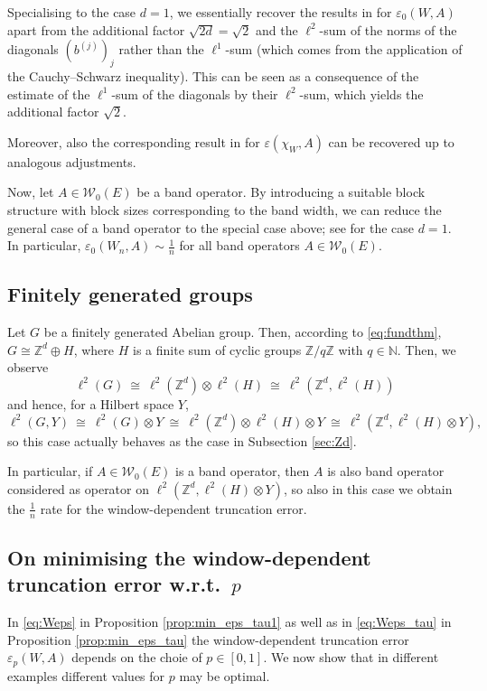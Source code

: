 \documentclass{article}
\newcommand\N{{\mathbb N}}
\newcommand\W{{\mathcal W}}
\newcommand\Z{{\mathbb Z}}
\newcommand\eps{{\varepsilon}}
\numberwithin{equation}{section}   %
\numberwithin{figure}{section}  %
\begin{document}
Specialising to the case $d=1$, we essentially recover the results in \cite[Corollary 5.4]{CW.Heng.ML:JST} for $\varepsilon_0(W,A)$ apart from the additional factor $\sqrt{2d} = \sqrt{2}$ and the $\ell^2$-sum of the norms of the diagonals $(b^{(j)})_j$ rather than the $\ell^1$-sum (which comes from the application of the Cauchy--Schwarz inequality). This can be seen as a consequence of the estimate of the $\ell^1$-sum of the diagonals by their $\ell^2$-sum, which yields the additional factor $\sqrt{2}$.

Moreover, also the corresponding result in \cite[Proposition 5.1]{CW.Heng.ML:JST} for $\varepsilon(\chi_W,A)$ can be recovered up to analogous adjustments.


Now, let $A\in \W_0(E)$ be a band operator. By introducing a suitable block structure with block sizes corresponding to the band width, we can reduce the general case of a band operator to the special case above; see \cite[Section 1.4]{CW.Heng.ML:JST} for the case $d=1$. In particular, $\eps_0(W_n,A)\sim \frac{1}{n}$ for all band operators $A\in \W_0(E)$.



    
\subsection{Finitely generated groups}

Let $G$ be a finitely generated Abelian group. Then, according to \eqref{eq:fundthm}, $G \cong \Z^d\oplus H$, where $H$ is a finite sum of cyclic groups $\Z/q\Z$ with $q\in \N$. Then, we observe 
\[
\ell^2(G)\ \cong\ \ell^2(\Z^d)\otimes \ell^2(H) \ \cong\ \ell^2(\Z^d,\ell^2(H))
\] 
and hence, for a Hilbert space $Y$, 
\[
\ell^2(G,Y)\ \cong\ \ell^2(G)\otimes Y\ \cong\ \ell^2(\Z^d) \otimes \ell^2(H)\otimes Y\ \cong\ \ell^2(\Z^d, \ell^2(H)\otimes Y),
\]
so this case actually behaves as the case in Subsection \ref{sec:Zd}.

In particular, if $A\in \W_0(E)$ is a band operator, then $A$ is also band operator considered as operator on $\ell^2(\Z^d, \ell^2(H)\otimes Y)$, so also in this case we obtain the $\frac{1}{n}$ rate for the window-dependent truncation error.


\subsection{On minimising the window-dependent truncation error w.r.t.\ \texorpdfstring{$p$}{p}}

In \eqref{eq:Weps} in Proposition \ref{prop:min_eps_tau1} as well as in \eqref{eq:Weps_tau} in Proposition \ref{prop:min_eps_tau} the window-dependent truncation error $\eps_p(W,A)$ depends on the choie of $p\in [0,1]$. We now show that in different examples different values for $p$ may be optimal.
\end{document}
